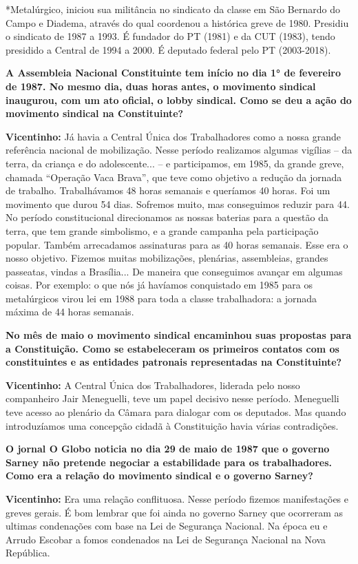 *​Metalúrgico, iniciou sua militância no sindicato da classe em São
Bernardo do Campo e Diadema, através do qual coordenou a histórica greve
de 1980. Presidiu o sindicato de 1987 a 1993. É fundador do PT (1981) e
da CUT (1983), tendo presidido a Central de 1994 a 2000. É deputado
federal pelo PT (2003-2018).

\textbf{A Assembleia Nacional Constituinte tem início no dia 1° de
fevereiro de 1987. No mesmo dia, duas horas antes, o movimento sindical
inaugurou, com um ato oficial, o lobby sindical. Como se deu a ação do
movimento sindical na Constituinte?}

\textbf{Vicentinho:} Já havia a Central Única dos Trabalhadores como a
nossa grande referência nacional de mobilização. Nesse período
realizamos algumas vigílias -- da terra, da criança e do adolescente...
-- e participamos, em 1985, da grande greve, chamada ``Operação Vaca
Brava'', que teve como objetivo a redução da jornada de trabalho.
Trabalhávamos 48 horas semanais e queríamos 40 horas. Foi um movimento
que durou 54 dias. Sofremos muito, mas conseguimos reduzir para 44. No
período constitucional direcionamos as nossas baterias para a questão da
terra, que tem grande simbolismo, e a grande campanha pela participação
popular. Também arrecadamos assinaturas para as 40 horas semanais. Esse
era o nosso objetivo. Fizemos muitas mobilizações, plenárias,
assembleias, grandes passeatas, vindas a Brasília... De maneira que
conseguimos avançar em algumas coisas. Por exemplo: o que nós já
havíamos conquistado em 1985 para os metalúrgicos virou lei em 1988 para
toda a classe trabalhadora: a jornada máxima de 44 horas semanais.

\textbf{No mês de maio o movimento sindical encaminhou suas propostas
para a Constituição. Como se estabeleceram os primeiros contatos com os
constituintes e as entidades patronais representadas na Constituinte?}

\textbf{Vicentinho:} A Central Única dos Trabalhadores, liderada pelo
nosso companheiro Jair Meneguelli, teve um papel decisivo nesse período.
Meneguelli teve acesso ao plenário da Câmara para dialogar com os
deputados. Mas quando introduzíamos uma concepção cidadã à Constituição
havia várias contradições.

\textbf{O jornal O Globo noticia no dia 29 de maio de 1987 que o governo
Sarney não pretende negociar a estabilidade para os trabalhadores.}
\textbf{Como era a relação do movimento sindical e o governo Sarney?}

\textbf{Vicentinho:} Era uma relação conflituosa. Nesse período fizemos
manifestações e greves gerais. É bom lembrar que foi ainda no governo
Sarney que ocorreram as ultimas condenações com base na Lei de Segurança
Nacional. Na época eu e Arrudo Escobar a fomos condenados na Lei de
Segurança Nacional na Nova República.

